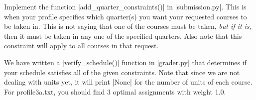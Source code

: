 \item {}
Implement the function |add_quarter_constraints()| in |submission.py|. This is
when your profile specifies which quarter(s) you want your requested courses to
be taken in. This is not saying that one of the courses must be taken,
{\em but if it is}, then it must be taken in any one of the specified quarters.
Also note that this constraint will apply to all courses in that request.

We have written a |verify_schedule()| function in |grader.py| that determines if
your schedule satisfies all of the given constraints. Note that since we are not
dealing with units yet, it will print |None| for the number of units of each
course. For profile3a.txt, you should find 3 optimal assignments with weight 1.0.
